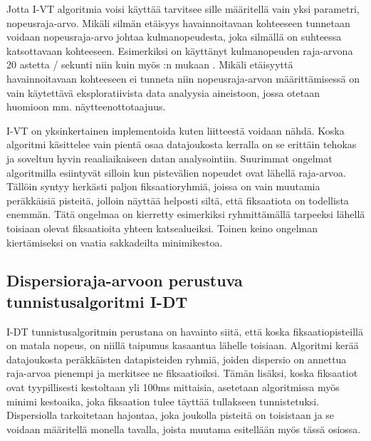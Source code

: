  Jotta I-VT algoritmia voisi käyttää tarvitsee sille määritellä vain yksi parametri, nopeusraja-arvo. Mikäli silmän etäisyys havainnoitavaan kohteeseen tunnetaan voidaan nopeusraja-arvo johtaa kulmanopeudesta, joka silmällä on suhteessa katsottavaan kohteeseen. Esimerkiksi \citet[s. 1099]{itti2005} on käyttänyt kulmanopeuden raja-arvona 20 astetta / sekunti niin kuin myös \citet[s. 73]{salvucci2000}:n mukaan \citep[s. 103-111]{megaw1984}.
Mikäli etäisyyttä havainnoitavaan kohteeseen ei tunneta niin nopeusraja-arvon määrittämisessä on vain käytettävä eksploratiivista data analyysia aineistoon, jossa otetaan huomioon mm. näytteenottotaajuus.

I-VT on yksinkertainen implementoida kuten liitteestä \emph{}  voidaan nähdä. Koska algoritmi käsittelee vain pientä osaa datajoukosta kerralla on se erittäin tehokas ja soveltuu hyvin reaaliaikaiseen datan analysointiin. \citep[s. 76]{salvucci2000} Suurimmat ongelmat algoritmilla esiintyvät silloin kun pistevälien nopeudet ovat lähellä raja-arvoa. Tällöin syntyy herkästi paljon fiksaatioryhmiä, joissa on vain muutamia peräkkäisiä pisteitä, jolloin näyttää helposti siltä, että fiksaatiota on todellista enemmän. Tätä ongelmaa on kierretty esimerkiksi ryhmittämällä tarpeeksi lähellä toisiaan olevat fiksaatioita yhteen katsealueiksi. \citep[s. 329]{just1980} Toinen keino ongelman kiertämiseksi on vaatia sakkadeilta minimikestoa. \citep[s. 103-111]{megaw1984}

\subsection{Dispersioraja-arvoon perustuva tunnistusalgoritmi I-DT}
I-DT tunnistusalgoritmin perustana on havainto siitä, että koska fiksaatiopisteillä on matala nopeus, on niillä taipumus kasaantua lähelle toisiaan. Algoritmi kerää datajoukosta peräkkäisten datapisteiden ryhmiä, joiden dispersio on annettua raja-arvoa pienempi ja merkitsee ne fiksaatioiksi. Tämän lisäksi, koska fiksaatiot ovat tyypillisesti kestoltaan yli 100ms mittaisia, asetetaan algoritmissa myös minimi kestoaika, joka fiksaation tulee täyttää tullakseen tunnistetuksi. \citep[s. 74]{salvucci2000} Dispersiolla tarkoitetaan hajontaa, joka joukolla pisteitä on toisistaan ja se voidaan määritellä monella tavalla, joista muutama esitellään myös tässä osiossa.

